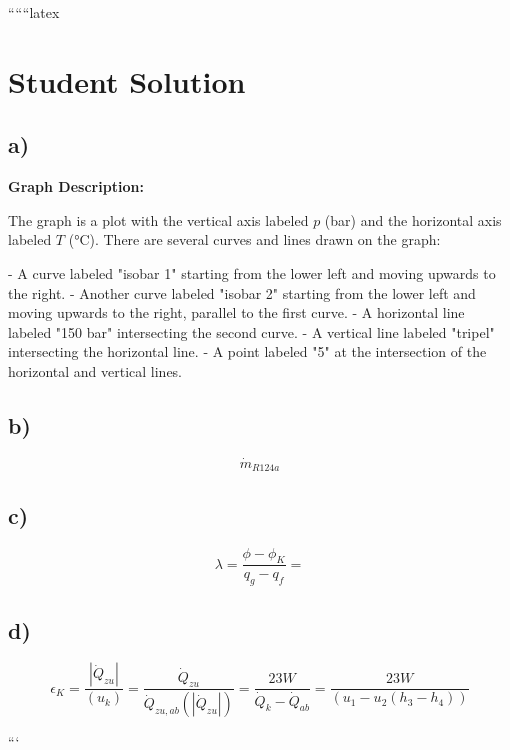 
``````latex


\section*{Student Solution}

\subsection*{a)}

\textbf{Graph Description:}

The graph is a plot with the vertical axis labeled \( p \) (bar) and the horizontal axis labeled \( T \) (°C). There are several curves and lines drawn on the graph:

- A curve labeled "isobar 1" starting from the lower left and moving upwards to the right.
- Another curve labeled "isobar 2" starting from the lower left and moving upwards to the right, parallel to the first curve.
- A horizontal line labeled "150 bar" intersecting the second curve.
- A vertical line labeled "tripel" intersecting the horizontal line.
- A point labeled "5" at the intersection of the horizontal and vertical lines.

\subsection*{b)}

\[
\dot{m}_{R124a}
\]

\subsection*{c)}

\[
\lambda = \frac{\phi - \phi_{K}}{q_{g} - q_{f}} = 
\]

\subsection*{d)}

\[
\epsilon_{K} = \frac{|\dot{Q}_{zu}|}{(u_{k})} = \frac{\dot{Q}_{zu}}{\dot{Q}_{zu,ab} (|\dot{Q}_{zu}|)} = \frac{23 W}{\dot{Q}_{k} - \dot{Q}_{ab}} = \frac{23 W}{(u_{1} - u_{2} (h_{3} - h_{4}))}
\]

```